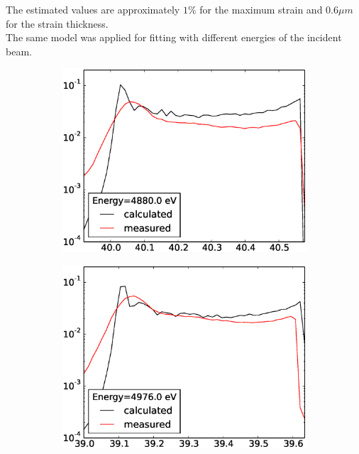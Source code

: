 \documentclass[12pt,oneside,notitlepage,abstracton,a4paper]{scrartcl}
\begin{document}
The estimated values are approximately $1 \%$ for the maximum strain and $0.6 \mu m$ for the strain thickness.\\

The same model was applied for fitting with different energies of the incident beam.


\begin{figure}[h]
 \centering
 \begin{subfigure}[h]{0.49\textwidth}
  \includegraphics[width=\textwidth]{pics/SrTiO3_4880.eps}
  \caption{}
  \label{en1}
 \end{subfigure}
 \begin{subfigure}[h]{0.49\textwidth}
  \includegraphics[width=\textwidth]{pics/SrTiO3_4976.eps}

\end{subfigure}
\end{figure}
\end{document}
